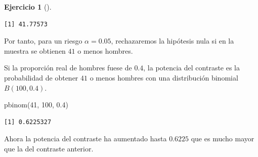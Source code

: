 \documentclass[
  a4paper,
]{scrreport}
\newenvironment{Shaded}{\begin{snugshade}}{\end{snugshade}}
\newcommand{\DecValTok}[1]{\textcolor[rgb]{0.68,0.00,0.00}{#1}}
\newcommand{\FloatTok}[1]{\textcolor[rgb]{0.68,0.00,0.00}{#1}}
\newcommand{\FunctionTok}[1]{\textcolor[rgb]{0.28,0.35,0.67}{#1}}
\newcommand{\NormalTok}[1]{\textcolor[rgb]{0.00,0.23,0.31}{#1}}
\theoremstyle{definition}
\newtheorem{exercise}{Ejercicio}[chapter]
\theoremstyle{remark}
\begin{document}
\begin{exercise}[]
\begin{enumerate}
\begin{tcolorbox}
\begin{verbatim}
[1] 41.77573
\end{verbatim}

  Por tanto, para un riesgo \(\alpha=0.05\), rechazaremos la hipótesis
  nula si en la muestra se obtienen \(41\) o menos hombres.

  Si la proporción real de hombres fuese de \(0.4\), la potencia del
  contraste es la probabilidad de obtener \(41\) o menos hombres con una
  distribución binomial \(B(100, 0.4)\).

\begin{Shaded}
\begin{Highlighting}[]
\FunctionTok{pbinom}\NormalTok{(}\DecValTok{41}\NormalTok{, }\DecValTok{100}\NormalTok{, }\FloatTok{0.4}\NormalTok{)}
\end{Highlighting}
\end{Shaded}

\begin{verbatim}
[1] 0.6225327
\end{verbatim}

  Ahora la potencia del contraste ha aumentado hasta \(0.6225\) que es
  mucho mayor que la del contraste anterior.

  \end{tcolorbox}
\end{enumerate}

\end{exercise}
\end{document}
